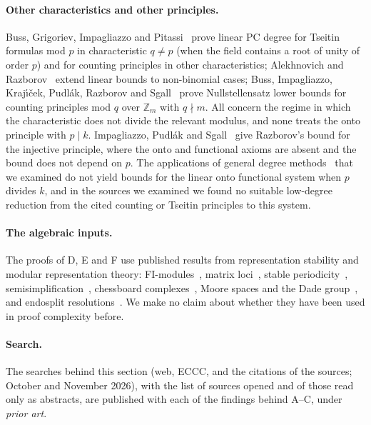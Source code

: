 \paragraph{Other characteristics and other principles.}  Buss, Grigoriev, Impagliazzo and
Pitassi~\cite{bgip2001} prove linear PC degree for Tseitin formulas mod $p$ in
characteristic $q\ne p$ (when the field contains a root of unity of order $p$) and for counting principles
in other characteristics; Alekhnovich and Razborov~\cite{alekhnovich2003nonbinomial} extend
linear bounds to non-binomial cases; Buss, Impagliazzo, Kraj\'\i\v cek, Pudl\'ak, Razborov
and Sgall~\cite{bikprs1996} prove Nullstellensatz lower bounds for counting principles mod
$q$ over $\mathbb Z_m$ with $q\nmid m$.  All concern the regime in which the characteristic
does not divide the relevant modulus, and none treats the onto principle with $p\mid k$.
Impagliazzo, Pudl\'ak and Sgall~\cite{ips1999} give Razborov's bound for the injective
principle, where the onto and functional axioms are absent and the bound does not depend on
$p$.  The applications of general degree methods~\cite{miksa2015generalized} that we examined do
not yield bounds for the linear onto functional system when $p$ divides $k$, and in the
sources we examined we found no suitable low-degree reduction from the cited counting or
Tseitin principles to this system.

\paragraph{The algebraic inputs.}  The proofs of D, E and F use published results from
representation stability and modular representation theory: FI-modules~\cite{churchellenberg},
matrix loci~\cite{rhoades2024}, stable periodicity~\cite{harman2015},
semisimplification~\cite{hone2025}, chessboard complexes~\cite{shareshianwachs}, Moore spaces
and the Dade group~\cite{yalcin2016}, and endosplit resolutions~\cite{miller2024}.  We make no claim about whether they have been
used in proof complexity before.

\paragraph{Search.}  The searches behind this section (web, ECCC, and the citations of the
sources; October and November 2026), with the list of sources opened and of those read only as
abstracts, are published with each of the findings behind A--C, under \emph{prior art}.

